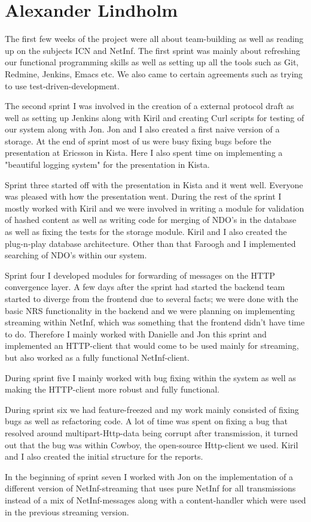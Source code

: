 \section{Alexander Lindholm}
The first few weeks of the project were all about team-building as well as reading up on the subjects ICN and NetInf. The first sprint was mainly about refreshing our functional programming skills as well as setting up all the tools such as Git, Redmine, Jenkins, Emacs etc. We also came to certain agreements such as trying to use test-driven-development. 

The second sprint I was involved in the creation of a external protocol draft as well as setting up Jenkins along with Kiril and creating Curl scripts for testing of our system along with Jon. Jon and I also created a first naive version of a storage. At the end of sprint most of us were busy fixing bugs before the presentation at Ericsson in Kista. Here I also spent time on implementing a "beautiful logging system" for the presentation in Kista.

Sprint three started off with the presentation in Kista and it went well. Everyone was pleased with how the presentation went. During the rest of the sprint I mostly worked with Kiril and we were involved in writing a module for validation of hashed content as well as writing code for merging of NDO's in the database as well as fixing the tests for the storage module. Kiril and I also created the plug-n-play database architecture. Other than that Faroogh and I implemented searching of NDO's within our system.

Sprint four I developed modules for forwarding of messages on the HTTP convergence layer.
A few days after the sprint had started the backend team started to diverge from the frontend due to several facts;
we were done with the basic NRS functionality in the backend and we were planning on implementing streaming within NetInf, which was something that the frontend didn't have time to do. 
Therefore I mainly worked with Danielle and Jon this sprint and implemented an HTTP-client that would come to be used mainly for streaming, but also worked as a fully functional NetInf-client. 

During sprint five I mainly worked with bug fixing within the system as well as making the HTTP-client more robust and fully functional.

During sprint six we had feature-freezed and my work mainly consisted of fixing bugs as well as refactoring code. A lot of time was spent on fixing a bug that resolved around multipart-Http-data being corrupt after transmission, it turned out that the bug was within Cowboy, the open-source Http-client we used. Kiril and I also created the initial structure for the reports. 

In the beginning of sprint seven I worked with Jon on the implementation of a different version of NetInf-streaming that uses pure NetInf for all transmissions instead of a mix of NetInf-messages along with a content-handler which were used in the previous streaming version. 

